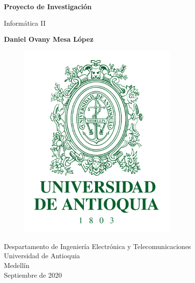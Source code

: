 \documentclass{article}
\begin{document}
\begin{titlepage}
    \begin{center}
        \vspace*{0.2cm}
            
        \Huge
        \textbf{Proyecto de Investigación}
            
        \vspace{0.5cm}
        \LARGE
        Informática II
            
        \vspace{1cm}
            
        \textbf{Daniel Ovany Mesa López}
        
        \vfill
        
        \begin{figure}[htp]
            \centering
            \includegraphics[width=8cm]{Images/Escudo_UdeA.png}
        \end{figure}
        
            
        \vspace{0.5cm}
            
        \Large
        Despartamento de Ingeniería Electrónica y Telecomunicaciones\\
        Universidad de Antioquia\\
        Medellín\\
        Septiembre de 2020
            
    \end{center}
\end{titlepage}

\tableofcontents
\end{document}
